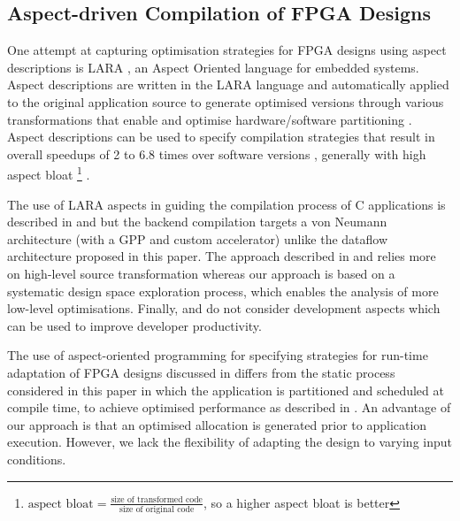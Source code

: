 \subsection{Aspect-driven Compilation of FPGA Designs}

One attempt at capturing optimisation strategies for FPGA designs
using aspect descriptions is LARA
\cite{Cardoso:Carvalho:Cutinho:Luk:Nobre:Diniz:Petrov:2012,
  Cardoso:Carvalho:Teixeira:Diniz:Goncalves:Petrov:2012}, an Aspect
Oriented language for embedded systems. Aspect descriptions are
written in the LARA language and automatically applied to the
original application source to generate optimised versions through
various transformations that enable and optimise hardware/software
partitioning \cite{Lam:Coutinho:Luk:2008}. Aspect descriptions can be
used to specify compilation strategies that result in overall
speedups of 2 to 6.8 times over software versions
\cite{Cardoso:Teixeira:Alves:Nobre:Diniz:Cutinho:Luk:2012}, generally
with high aspect bloat \footnote{ $\text{aspect bloat} =
  \frac{\text{size of transformed code}}{\text{size of original
      code}}$, so a higher aspect bloat is better}
\cite{Cardoso:Carvalho:Cutinho:Luk:Nobre:Diniz:Petrov:2012}.

The use of LARA aspects in guiding the compilation process of C
applications is described in
\cite{Cardoso:Teixeira:Alves:Nobre:Diniz:Cutinho:Luk:2012} and
\cite{cardoso2011new} but the backend compilation targets a von
Neumann architecture (with a GPP and custom accelerator) unlike the
dataflow architecture proposed in this paper. The approach described
in \cite{Cardoso:Teixeira:Alves:Nobre:Diniz:Cutinho:Luk:2012} and
\cite{cardoso2011new} relies more on high-level source transformation
whereas our approach is based on a systematic design space exploration
process, which enables the analysis of more low-level
optimisations. Finally,
\cite{Cardoso:Teixeira:Alves:Nobre:Diniz:Cutinho:Luk:2012} and
\cite{cardoso2011new} do not consider development aspects which can be
used to improve developer productivity.


The use of aspect-oriented programming for specifying strategies for
run-time adaptation of FPGA designs discussed in \cite{6322875}
differs from the static process considered in this paper in which the
application is partitioned and scheduled at compile time, to achieve
optimised performance as described in
\cite{Xinyu:Qiwei:Luk:Qiang:Pell:2012}. An advantage of our approach
is that an optimised allocation is generated prior to application
execution. However, we lack the flexibility of adapting the design to
varying input conditions.

